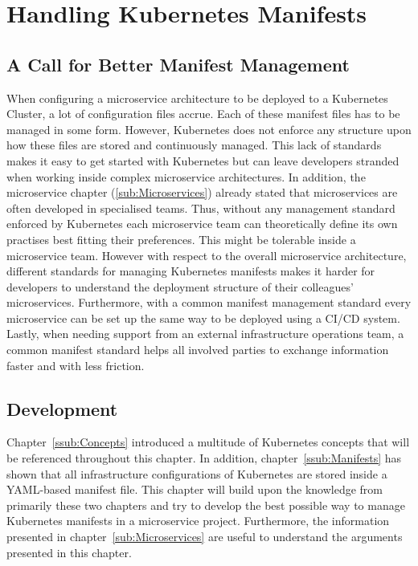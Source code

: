 
\section{Handling Kubernetes Manifests}%
\label{sec:Handling_Kubernetes_Manifests}

\subsection{A Call for Better Manifest Management}%
\label{sub:A_Call_for_Better_Manifest_Management}
When configuring a microservice architecture to be deployed to a Kubernetes
Cluster, a lot of configuration files accrue. Each of these manifest files has
to be managed in some form. However, Kubernetes does not enforce any structure
upon how these files are stored and continuously managed. This lack of
standards makes it easy to get started with Kubernetes but can leave developers
stranded when working inside complex microservice architectures. In addition,
the microservice chapter (\ref{sub:Microservices}) already stated that
microservices are often developed in specialised teams. Thus, without any
management standard enforced by Kubernetes each microservice team can
theoretically define its own practises best fitting their preferences. This
might be tolerable inside a microservice team. However with respect to the
overall microservice architecture, different standards for managing Kubernetes
manifests makes it harder for developers to understand the deployment structure
of their colleagues' microservices. Furthermore, with a common manifest
management standard every microservice can be set up the same way to be
deployed using a \ac{CI}/\ac{CD} system. Lastly, when needing support from an
external infrastructure operations team, a common manifest standard helps all
involved parties to exchange information faster and with less friction.

\subsection{Development}%
\label{sub:Development}
Chapter~\ref{ssub:Concepts} introduced a multitude of Kubernetes concepts that
will be referenced throughout this chapter. In addition,
chapter~\ref{ssub:Manifests} has shown that all infrastructure configurations of
Kubernetes are stored inside a YAML-based manifest file. This chapter will
build upon the knowledge from primarily these two chapters and try to develop
the best possible way to manage Kubernetes manifests in a microservice project.
Furthermore, the information presented in chapter~\ref{sub:Microservices} are
useful to understand the arguments presented in this chapter.

